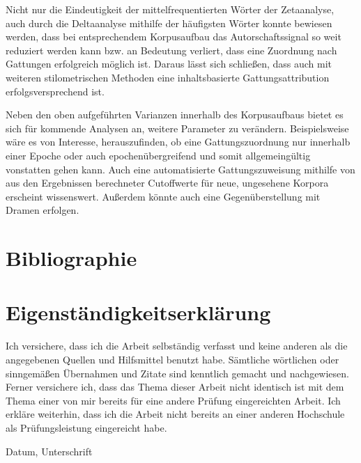 \documentclass[a4paper,10p]{article}
\begin{document}
Nicht nur die Eindeutigkeit der mittelfrequentierten Wörter der Zetaanalyse, auch durch die Deltaanalyse mithilfe der häufigsten Wörter konnte bewiesen werden, dass bei entsprechendem Korpusaufbau das Autorschaftssignal so weit reduziert werden kann bzw. an Bedeutung verliert, dass eine Zuordnung nach Gattungen erfolgreich möglich ist. Daraus lässt sich schließen, dass auch mit weiteren stilometrischen Methoden eine inhaltsbasierte Gattungsattribution erfolgsversprechend ist. \par 

Neben den oben aufgeführten Varianzen innerhalb des Korpusaufbaus bietet es sich für kommende Analysen an, weitere Parameter zu verändern. Beispielsweise wäre es von Interesse, herauszufinden, ob eine Gattungszuordnung nur innerhalb einer Epoche oder auch epochenübergreifend und somit allgemeingültig vonstatten gehen kann. Auch eine automatisierte Gattungszuweisung mithilfe von aus den Ergebnissen berechneter Cutoffwerte für neue, ungesehene Korpora erscheint wissenswert. Außerdem könnte auch eine Gegenüberstellung mit Dramen erfolgen.



\newpage


\section{Bibliographie}





\newpage
\section{Eigenständigkeitserklärung}

Ich versichere, dass ich die Arbeit selbständig verfasst und keine anderen als die angegebenen Quellen und Hilfsmittel benutzt habe. Sämtliche wörtlichen oder sinngemäßen Übernahmen und Zitate sind kenntlich gemacht und nachgewiesen. Ferner versichere ich, dass das Thema dieser Arbeit nicht identisch ist mit dem Thema einer von mir bereits für eine andere Prüfung eingereichten Arbeit. Ich erkläre weiterhin, dass ich die Arbeit nicht bereits an einer anderen Hochschule als Prüfungsleistung eingereicht habe. \par 

\vspace{50pt}


\noindent Datum, Unterschrift
\end{document}
